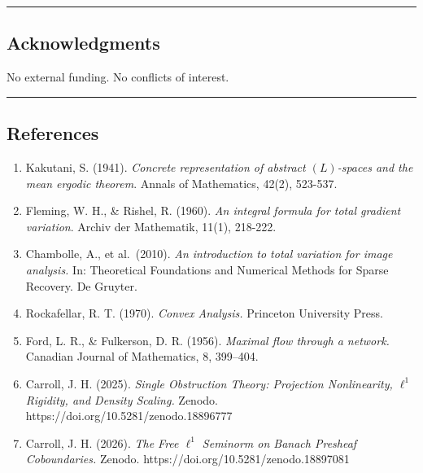 \documentclass[
]{amsart}
\providecommand{\tightlist}{%
  \setlength{\itemsep}{0pt}\setlength{\parskip}{0pt}}
\begin{document}
\begin{center}\rule{0.5\linewidth}{0.5pt}\end{center}

\hypertarget{acknowledgments}{%
\subsection{Acknowledgments}\label{acknowledgments}}

No external funding. No conflicts of interest.

\begin{center}\rule{0.5\linewidth}{0.5pt}\end{center}

\hypertarget{references}{%
\subsection{References}\label{references}}

\begin{enumerate}
\def\labelenumi{\arabic{enumi}.}
\tightlist
\item
  Kakutani, S. (1941). \emph{Concrete representation of abstract
  \((L)\)-spaces and the mean ergodic theorem}. Annals of Mathematics,
  42(2), 523-537.
\item
  Fleming, W. H., \& Rishel, R. (1960). \emph{An integral formula for
  total gradient variation}. Archiv der Mathematik, 11(1), 218-222.
\item
  Chambolle, A., et al.~(2010). \emph{An introduction to total variation
  for image analysis.} In: Theoretical Foundations and Numerical Methods
  for Sparse Recovery. De Gruyter.
\item
  Rockafellar, R. T. (1970). \emph{Convex Analysis.} Princeton
  University Press.
\item
  Ford, L. R., \& Fulkerson, D. R. (1956). \emph{Maximal flow through a
  network.} Canadian Journal of Mathematics, 8, 399--404.
\item
  Carroll, J. H. (2025). \emph{Single Obstruction Theory: Projection
  Nonlinearity, \(\ell^1\) Rigidity, and Density Scaling.} Zenodo.
  https://doi.org/10.5281/zenodo.18896777
\item
  Carroll, J. H. (2026). \emph{The Free \(\ell^1\) Seminorm on Banach
  Presheaf Coboundaries.} Zenodo.
  https://doi.org/10.5281/zenodo.18897081
\end{enumerate}
\end{document}
